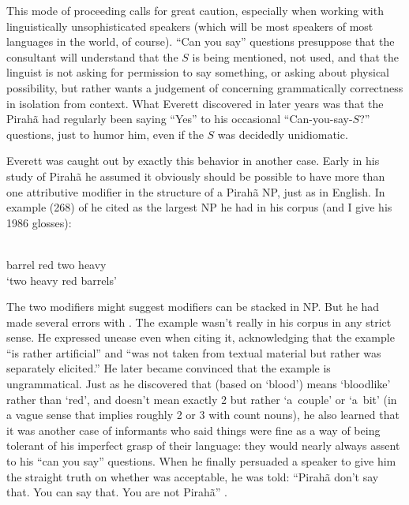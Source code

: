 \documentclass[output=paper,colorlinks,citecolor=brown
]{langscibook}
\begin{document}
This mode of proceeding calls for great caution, especially when
working with linguistically unsophisticated speakers (which will be
most speakers of most languages in the world, of course). ``Can you say''
questions presuppose that the consultant will understand that the $S$
is being mentioned, not used, and that the linguist is not asking
for permission to say something, or asking about physical possibility,
but rather wants a judgement of concerning grammatically correctness
in isolation from context. What Everett discovered in later years was
that the Pirahã had regularly been saying ``Yes'' to his occasional
``Can-you-say-$S$?'' questions, just to humor him, even if the $S$ was
decidedly unidiomatic.

Everett was caught out by exactly this behavior in another case. Early
in his study of Pirahã he assumed it obviously should be possible
to have more than one attributive modifier in the structure of a
Pirahã NP, just as in English. In example (268) of \citet[273]{Everett86HAL} he cited  as the largest NP he had
in his corpus (and I give his 1986 glosses):

\ea\label{ex:pullum:4}
\gll {}     
      \\
     barrel   red   two   heavy \\
     \glt `two heavy red barrels'
\z

\noindent
The two modifiers might suggest modifiers can be stacked in NP. But
he had made several errors with . The example wasn't really in
his corpus in any strict sense. He expressed unease even when citing
it, acknowledging that the example ``is rather artificial'' and ``was
not taken from textual material but rather was separately elicited.''
He later became convinced that the example is ungrammatical. Just
as he discovered that  (based on 
`blood') means `bloodlike' rather than `red', and 
doesn't mean exactly 2 but rather `a~couple' or `a~bit' (in a vague
sense that implies roughly 2 or 3 with count nouns), he also learned
that it was another case of informants who said things were fine as
a way of being tolerant of his imperfect grasp of their language:
they would nearly always assent to his ``can you say'' questions. When
he finally persuaded a speaker to give him the straight truth on
whether  was acceptable, he was told: ``Pirahã don't say that.
You can say that. You are not Pirahã'' \citep[422]{Everett09}.
\end{document}
